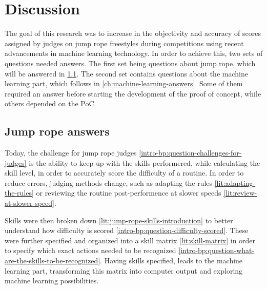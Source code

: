 
\chapter{Discussion}%
\label{ch:discussion}


The goal of this research was to increase in the objectivity and accuracy of scores assigned by judges on jump rope freestyles during competitions using recent advancements in machine learning technology.
In order to achieve this, two sets of questions needed answers.
The first set being questions about jump rope, which will be answered in \ref{ch:discussion-jump-rope-answers}. The second set contains questions about the machine learning part, which follows in \ref{ch:machine-learning-answers}. Some of them required an answer before starting the development of the proof of concept, while others depended on the PoC.

\section{Jump rope answers}
\label{ch:discussion-jump-rope-answers}

Today, the challenge for jump rope judges \ref{intro-bp:question-challenges-for-judges} is the ability to keep up with the skills performered, while calculating the skill level, in order to accurately score the difficulty of a routine. In order to reduce errors, judging methods change, such as adapting the rules \ref{lit:adapting-the-rules} or reviewing the routine post-performence at slower speeds \ref{lit:review-at-slower-speed}.

Skills were then broken down \ref{lit:jump-rope-skills-introduction} to better understand how difficulty is scored \ref{intro-bp:question-difficulty-scored}. These were further specified and organized into a skill matrix \ref{lit:skill-matrix} in order to specify which exact actions needed to be recognized \ref{intro-bp:question-what-are-the-skills-to-be-recognized}.
Having skills specified, leads to the machine learning part, transforming this matrix into computer output and exploring machine learning possibilities. %


